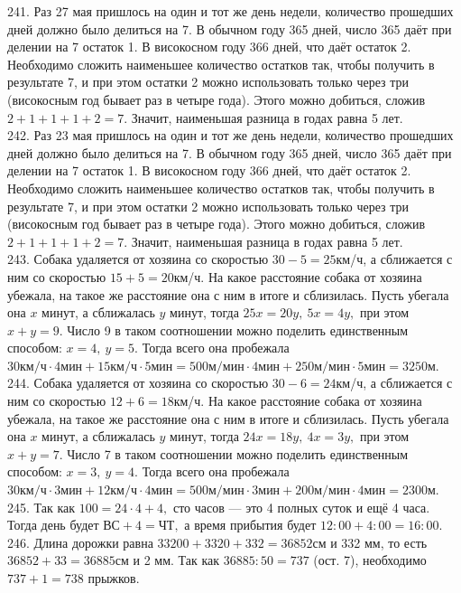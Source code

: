 241. Раз 27 мая пришлось на один и тот же день недели, количество прошедших дней должно было делиться на 7. В обычном году 365 дней, число 365 даёт при делении на 7 остаток 1. В високосном году 366 дней, что даёт остаток 2. Необходимо сложить наименьшее количество остатков так, чтобы получить в результате 7, и при этом остатки 2 можно использовать только через три (високосным год бывает раз в четыре года). Этого можно добиться, сложив $2+1+1+1+2=7.$ Значит, наименьшая разница в годах равна 5 лет. \\
242. Раз 23 мая пришлось на один и тот же день недели, количество прошедших дней должно было делиться на 7. В обычном году 365 дней, число 365 даёт при делении на 7 остаток 1. В високосном году 366 дней, что даёт остаток 2. Необходимо сложить наименьшее количество остатков так, чтобы получить в результате 7, и при этом остатки 2 можно использовать только через три (високосным год бывает раз в четыре года). Этого можно добиться, сложив $2+1+1+1+2=7.$ Значит, наименьшая разница в годах равна 5 лет.\\
243. Собака удаляется от хозяина со скоростью $30-5=25$км/ч, а сближается с ним со скоростью $15+5=20$км/ч. На какое расстояние собака от хозяина убежала, на такое же расстояние она с ним в итоге и сблизилась. Пусть убегала она $x$ минут, а сближалась $y$ минут, тогда $25x=20y,\ 5x=4y,$ при этом $x+y=9.$ Число 9 в таком соотношении можно поделить единственным способом: $x=4,\ y=5.$ Тогда всего она пробежала $30\text{км/ч}\cdot4\text{мин}+15\text{км/ч}\cdot5\text{мин}=500\text{м/мин}\cdot4\text{мин}+
250\text{м/мин}\cdot5\text{мин}=3250$м.\\
244. Собака удаляется от хозяина со скоростью $30-6=24$км/ч, а сближается с ним со скоростью $12+6=18$км/ч. На какое расстояние собака от хозяина убежала, на такое же расстояние она с ним в итоге и сблизилась. Пусть убегала она $x$ минут, а сближалась $y$ минут, тогда $24x=18y,\ 4x=3y,$ при этом $x+y=7.$ Число 7 в таком соотношении можно поделить единственным способом: $x=3,\ y=4.$ Тогда всего она пробежала $30\text{км/ч}\cdot3\text{мин}+12\text{км/ч}\cdot4\text{мин}=500\text{м/мин}\cdot3\text{мин}+
200\text{м/мин}\cdot4\text{мин}=2300$м.\\
245. Так как $100=24\cdot4+4,$ сто часов --- это 4 полных суток и ещё 4 часа. Тогда день будет $\text{ВС}+4=\text{ЧТ},$ а время прибытия будет $12:00+4:00=16:00.$\\
246. Длина дорожки равна $33200+3320+332=36852$см и 332 мм, то есть $36852+33=36885$см и 2 мм. Так как $36885:50=737$ (ост. 7), необходимо $737+1=738$ прыжков.\\
